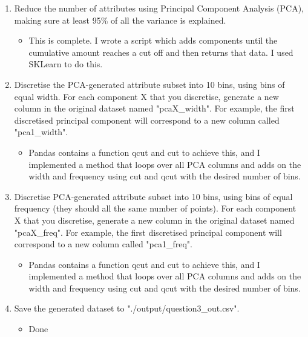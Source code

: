 \documentclass{scrreprt}
\begin{document}
\begin{enumerate}
	\item Reduce the number of attributes using Principal Component Analysis (PCA), making sure at least 95\% of all the variance is explained.
	\begin{itemize}
		\item This is complete. I wrote a script which adds components until the cumulative amount reaches a cut off and then returns that data. I used SKLearn to do this.
	\end{itemize}
	\item Discretise the PCA-generated attribute subset into 10 bins, using bins of equal width. For each component X that you discretise, generate a new column in the original dataset named "pcaX\_width". For example, the first discretised principal component will correspond to a new column called "pca1\_width".
		\begin{itemize}
		\item Pandas contains a function qcut and cut to achieve this, and I implemented a method that loops over all PCA columns and adds on the width and frequency using cut and qcut with the desired number of bins.
	\end{itemize}
	\item Discretise PCA-generated attribute subset into 10 bins, using bins of equal frequency (they should all the same number of points). For each component X that you discretise, generate a new column in the original dataset named "pcaX\_freq". For example, the first discretised principal component will correspond to a new column called "pca1\_freq".
		\begin{itemize}
		\item Pandas contains a function qcut and cut to achieve this, and I implemented a method that loops over all PCA columns and adds on the width and frequency using cut and qcut with the desired number of bins.
	\end{itemize}
	\item Save the generated dataset to "./output/question3\_out.csv".
		\begin{itemize}
		\item Done
	\end{itemize}
	
\end{enumerate}

	
\end{document}

